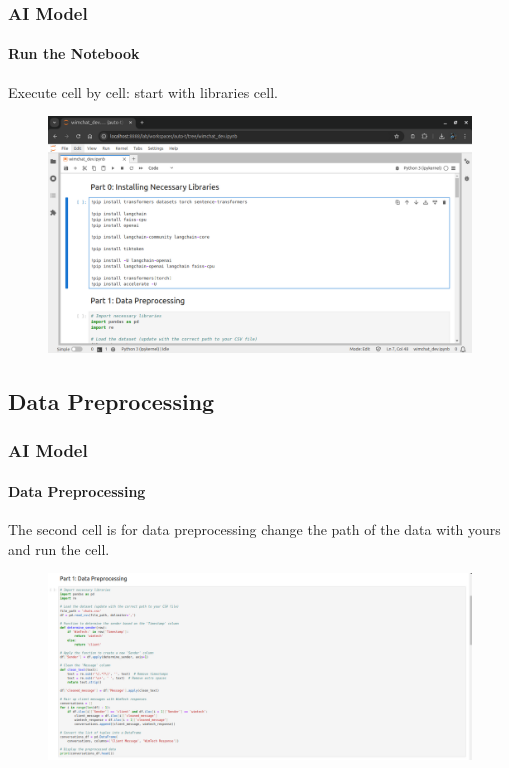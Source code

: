 \documentclass[
	11pt, %
]{beamer}
\begin{document}
\begin{frame}
	\frametitle{AI Model}
	\framesubtitle{Run the Notebook} %
	
	Execute cell by cell: start with libraries cell.

	\begin{figure}
		\includegraphics[width=1\linewidth]{notebook.png}
	\end{figure}

\end{frame}


\subsection{Data Preprocessing}

\begin{frame}
	\frametitle{AI Model}
	\framesubtitle{Data Preprocessing} %
	
	The second cell is for data preprocessing change the path of the data with yours and run the cell.

	\begin{figure}
		\includegraphics[width=1\linewidth]{data_preprocessing_cell.png}
	\end{figure}

\end{frame}
\end{document}
